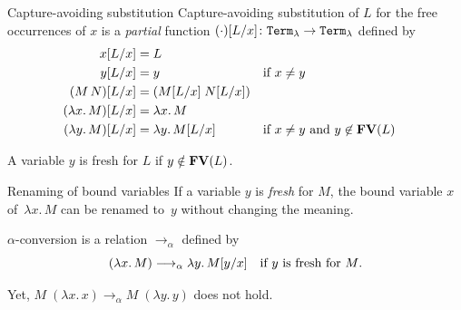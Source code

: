 \begin{frame}{Capture-avoiding substitution}
  Capture-avoiding substitution of $L$ for the \alert{free occurrences} of $x$ is a
  \emph{partial} function $(\cdot)[{L}/{x}]\colon \mathtt{Term}_\lambda \to \mathtt{Term}_\lambda$ defined by
  \begin{align*}
    x[{L}/{x}] & = L \\
    y[{L}/{x}] & = y && \text{if $x \neq y$} \\
    (M\, N)[{L}/{x}] & = (M[{L}/{x}]\; N[{L}/{x}]) \\
    (\lambda x.\, M)[{L}/{x}] & = \lambda x.\, M \\
    (\lambda y.\, M)[{L}/{x}] & = \lambda y.\, M[{L}/{x}]                                 &&\text{if $x \neq y$ and $y \not\in \mathbf{FV}(L)$}
  \end{align*}
  \begin{definition}[Freshness]
    A variable $y$ is \alert{fresh} for $L$ if $y \notin \mathbf{FV}(L)$.  
  \end{definition}
\end{frame}

\begin{frame}{Renaming of bound variables}
If a variable $y$ is \emph{fresh} for $M$, the bound variable $x$ of~$\lambda
x.\, M$ can be renamed to~$y$ without changing the meaning. 
\begin{definition}
  $\alpha$-conversion is a relation $\to_\alpha$ defined by
  \[
    (\lambda x.\, M) \longrightarrow_\alpha \lambda y.\, M[{y}/{x}]
    \quad\text{if $y$ is fresh for $M$}.
  \]
\end{definition}

Yet, $M\;(\lambda x.\, x) \longrightarrow_\alpha M\;(\lambda y.\, y)$ does not hold.
\end{frame}

